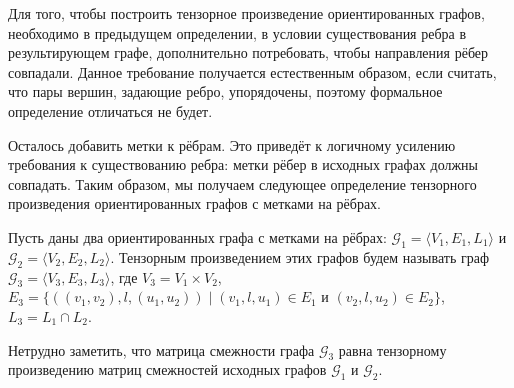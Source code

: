 Для того, чтобы построить тензорное произведение ориентированных графов, необходимо в предыдущем определении, в условии существования ребра в результирующем графе, дополнительно потребовать, чтобы направления рёбер совпадали.
Данное требование получается естественным образом, если считать, что пары вершин, задающие ребро, упорядочены, поэтому формальное определение отличаться не будет.

Осталось добавить метки к рёбрам.
Это приведёт к логичному усилению требования к существованию ребра: метки рёбер в исходных графах должны совпадать.
Таким образом, мы получаем следующее определение тензорного произведения ориентированных графов с метками на рёбрах.

\begin{definition}
Пусть даны два ориентированных графа с метками на рёбрах: $\mathcal{G}_1 = \langle V_1, E_1, L_1 \rangle$ и $\mathcal{G}_2 = \langle V_2, E_2, L_2 \rangle$.
Тензорным произведением этих графов будем называть граф $\mathcal{G}_3 = \langle V_3, E_3, L_3\rangle$, где $V_3 = V_1 \times V_2$, $E_3 = \{ ((v_1,v_2),l,(u_1,u_2)) \mid (v_1,l,u_1) \in E_1 \text{ и } (v_2,l,u_2) \in E_2 \}$, $L_3=L_1 \cap L_2$.
\end{definition}

Нетрудно заметить, что матрица смежности графа $\mathcal{G}_3$ равна тензорному произведению матриц смежностей исходных графов $\mathcal{G}_1$ и $\mathcal{G}_2$.

